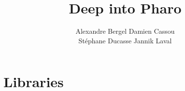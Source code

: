 \documentclass[a4paper,10pt,twoside]{book}
\begin{document}
\frontmatter
\setcounter{page}{1}
\pagestyle{headings}
\author{
	Alexandre Bergel\quad 
	Damien Cassou\quad \\
	St\'ephane Ducasse\quad 
	Jannik Laval
	}
\title{\Huge\bf Deep into Pharo%
}

\date{}
\maketitle




\tableofcontents
\sloppy %
\mainmatter






\part{Libraries}



 
\end{document}
